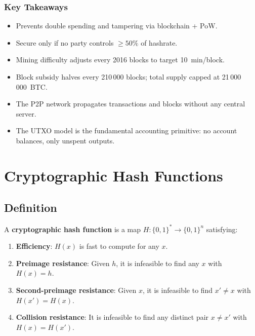 \documentclass[12pt,a4paper,openany]{book}
\theoremstyle{definition}
\theoremstyle{plain}
\theoremstyle{remark}
\begin{document}
\subsection{Key Takeaways}

\begin{itemize}
  \item Prevents double spending and tampering via blockchain + PoW.
  \item Secure only if no party controls $\geq 50\%$ of hashrate.
  \item Mining difficulty adjusts every 2016 blocks to target 10~min/block.
  \item Block subsidy halves every 210\,000 blocks; total supply capped at
        21\,000\,000~BTC.
  \item The P2P network propagates transactions and blocks without any
        central server.
  \item The UTXO model is the fundamental accounting primitive: no
        account balances, only unspent outputs.
\end{itemize}


\chapter{Cryptographic Hash Functions}
\label{chap:hash}

\section{Definition}

\begin{definitionbox}
  A \textbf{cryptographic hash function} is a map
  $H:\{0,1\}^*\!\to\{0,1\}^n$ satisfying:
  \begin{enumerate}
    \item \textbf{Efficiency}: $H(x)$ is fast to compute for any $x$.
    \item \textbf{Preimage resistance}: Given $h$, it is infeasible to
          find any $x$ with $H(x)=h$.
    \item \textbf{Second-preimage resistance}: Given $x$, it is infeasible
          to find $x'\neq x$ with $H(x')=H(x)$.
    \item \textbf{Collision resistance}: It is infeasible to find any
          distinct pair $x\neq x'$ with $H(x)=H(x')$.
  \end{enumerate}
\end{definitionbox}
\end{document}
